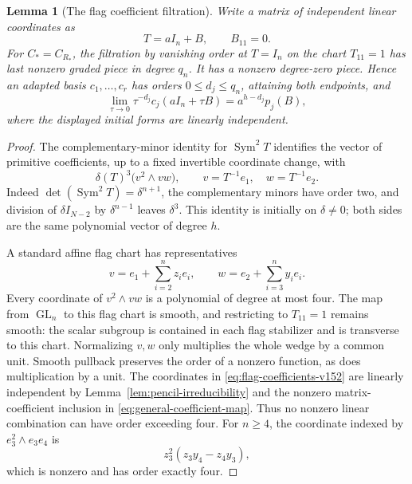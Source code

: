 \documentclass[11pt,reqno]{amsart}
\numberwithin{equation}{section}
\newtheorem{lemma}[theorem]{Lemma}
\theoremstyle{definition}\newtheorem{definition}[theorem]{Definition}
\theoremstyle{remark}\newtheorem{remark}[theorem]{Remark}
\DeclareMathOperator{\Sym}{Sym}\DeclareMathOperator{\Gr}{Gr}
\begin{document}
\begin{lemma}[The flag coefficient filtration]
\label{lem:flag-jets-v152}
Write a matrix of independent linear coordinates as
\[
                    T=aI_n+B,\qquad B_{11}=0.
\]
For $C_*=C_{R_*}$, the filtration by vanishing order at $T=I_n$
on the chart $T_{11}=1$ has last nonzero graded piece in degree $q_n$.
It has a nonzero degree-zero piece.  Hence an adapted basis
$c_1,\ldots,c_r$ has orders $0\leq d_j\leq q_n$, attaining both
endpoints, and
\begin{equation}\label{eq:flag-initial-v152}
 \lim_{\tau\to0}\tau^{-d_j}c_j(aI_n+\tau B)
                           =a^{h-d_j}p_j(B),
\end{equation}
where the displayed initial forms are linearly independent.
\end{lemma}
\begin{proof}
The complementary-minor identity for $\Sym^2T$ identifies the vector
of primitive coefficients, up to a fixed invertible coordinate
change, with
\begin{equation}\label{eq:flag-coefficients-v152}
 \delta(T)^3\bigl(v^2\wedge vw\bigr),\qquad
                 v=T^{-1}e_1,\quad w=T^{-1}e_2.
\end{equation}
Indeed $\det(\Sym^2T)=\delta^{n+1}$, the complementary minors have
order two, and division of $\delta I_{N-2}$ by $\delta^{n-1}$ leaves
$\delta^3$.  This identity is initially on $\delta\ne0$; both sides
are the same polynomial vector of degree $h$.

A standard affine flag chart has representatives
\[
       v=e_1+\sum_{i=2}^n z_i e_i,
       \qquad w=e_2+\sum_{i=3}^n y_i e_i.
\]
Every coordinate of $v^2\wedge vw$ is a polynomial of degree at most
four.  The map from $\operatorname{GL}_n$ to this flag chart is
smooth, and restricting to $T_{11}=1$ remains smooth: the scalar
subgroup is contained in each flag stabilizer and is transverse to
this chart.  Normalizing $v,w$ only multiplies the whole wedge by
a common unit.  Smooth pullback preserves the order of a nonzero
function, as does multiplication by a unit.  The coordinates in
\eqref{eq:flag-coefficients-v152} are linearly independent by Lemma~\ref{lem:pencil-irreducibility} and the nonzero
matrix-coefficient inclusion in \eqref{eq:general-coefficient-map}.  Thus no nonzero linear
combination can have order exceeding four.  For $n\geq4$, the
coordinate indexed by $e_3^2\wedge e_3e_4$ is
\[
                       z_3^2(z_3y_4-z_4y_3),
\]
which is nonzero and has order exactly four.


\end{proof}
\end{document}
